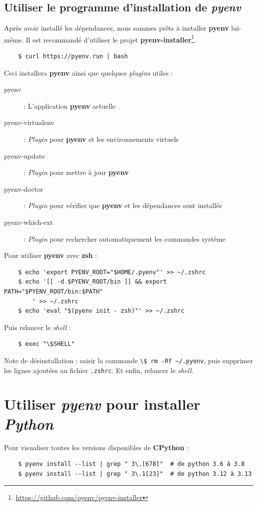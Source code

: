 \subsection*{Utiliser le programme d'installation de \textit{pyenv}}
Après avoir installé les dépendances, nous sommes prêts à installer \textbf{pyenv} lui-même. Il est recommandé d'utiliser le projet \textbf{pyenv-installer}\footnote{\url{https://github.com/pyenv/pyenv-installer}}.
\begin{verbatim}
    $ curl https://pyenv.run | bash
\end{verbatim}

Ceci installera \textbf{pyenv} ainsi que quelques \textit{plugins} utiles :
\begin{description}
    \item[pyenv]: L'application \textbf{pyenv} actuelle
    \item[pyenv-virtualenv] : \textit{Plugin} pour \textbf{pyenv} et les environnements virtuels
    \item[pyenv-update] : \textit{Plugin} pour mettre à jour \textbf{pyenv}
    \item[pyenv-doctor] : \textit{Plugin} pour vérifier que \textbf{pyenv} et les dépendances sont installés
    \item[pyenv-which-ext] : \textit{Plugin} pour rechercher automatiquement les commandes système
\end{description}

Pour utiliser \textbf{pyenv} avec \textbf{zsh} :
\begin{verbatim}
    $ echo 'export PYENV_ROOT="$HOME/.pyenv"' >> ~/.zshrc
    $ echo '[[ -d $PYENV_ROOT/bin ]] && export PATH="$PYENV_ROOT/bin:$PATH"
        ' >> ~/.zshrc
    $ echo 'eval "$(pyenv init - zsh)"' >> ~/.zshrc 
\end{verbatim}

Puis relancer le \textit{shell} :
\begin{verbatim}
    $ exec "\$SHELL"
\end{verbatim}

Note de désinstallation  : saisir la commande \verb|\$ rm -Rf ~/.pyenv|, puis supprimer les lignes ajoutées au fichier \texttt{.zshrc}. Et enfin, relancer le \textit{shell}.

\section{Utiliser \textit{pyenv} pour installer \textit{Python}}
Pour visualiser toutes les versions disponibles de \textbf{CPython} :
\begin{verbatim}
    $ pyenv install --list | grep " 3\.[678]"  # de python 3.6 à 3.8
    $ pyenv install --list | grep " 3\.1[23]"  # de python 3.12 à 3.13
\end{verbatim}

